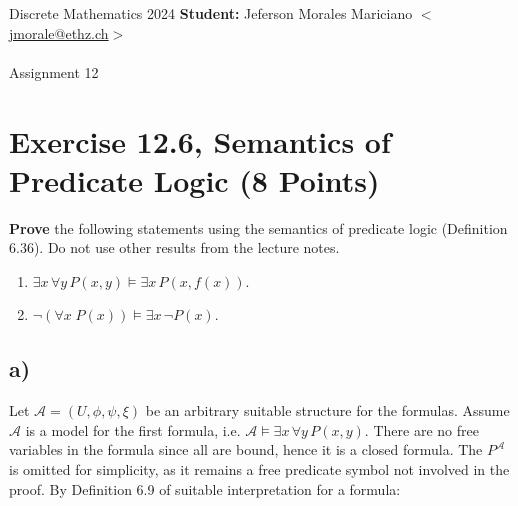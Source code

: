\documentclass[unicode,11pt,a4paper,oneside,numbers=endperiod,openany]{scrartcl}
\def\struct{\mathcal{A}}
\begin{document}
\setassignment
{}

\serieheader
{Discrete Mathematics}
{2024}
{%
\textbf{Student:} Jeferson Morales Mariciano 
\href{mailto:jmorale@ethz.ch}{\(<\)jmorale@ethz.ch\(>\)} \\\\}
{\vspace{-1cm}}%
{Assignment 12}{}

\section*{Exercise 12.6, Semantics of Predicate Logic \hfill (8 Points)}
\textbf{Prove} the following statements using the semantics of predicate logic 
(Definition 6.36).
Do not use other results from the lecture notes.

\begin{enumerate}[label=\textbf{\alph*)}]
    \item 
    \( \exists x \, \forall y \, P(x,y) \models \exists x \, P(x,f(x)) \).

    \item 
    \( \neg (\forall x \; P(x)) \models \exists x \, \neg P(x) \).

\end{enumerate}

\subsection*{a)}

Let \( \struct = (U, \phi, \psi, \xi) \) be an arbitrary suitable structure for the formulas.
Assume \( \struct \) is a model for the first formula, 
i.e. \( \struct \models \exists x \, \forall y \, P(x,y) \).
There are no free variables in the formula since all are bound, hence it is a closed formula. 
The \( P^\struct \) is omitted for simplicity, as it remains a free predicate symbol 
not involved in the proof.
By Definition 6.9 of suitable interpretation for a formula:
\end{document}
